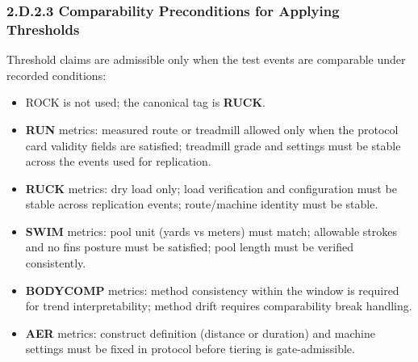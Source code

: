 \documentclass[10pt]{article}
\begin{document}
\subsubsection*{2.D.2.3 Comparability Preconditions for Applying Thresholds}

Threshold claims are admissible only when the test events are comparable under recorded conditions:

\begin{itemize}
\item ROCK is not used; the canonical tag is \textbf{RUCK}.
\item \textbf{RUN} metrics: measured route or treadmill allowed only when the protocol card validity fields are satisfied; treadmill grade and settings must be stable across the events used for replication.
\item \textbf{RUCK} metrics: dry load only; load verification and configuration must be stable across replication events; route/machine identity must be stable.
\item \textbf{SWIM} metrics: pool unit (yards vs meters) must match; allowable strokes and no fins posture must be satisfied; pool length must be verified consistently.
\item \textbf{BODYCOMP} metrics: method consistency within the window is required for trend interpretability; method drift requires comparability break handling.
\item \textbf{AER} metrics: construct definition (distance or duration) and machine settings must be fixed in protocol before tiering is gate-admissible.
\end{itemize}
\end{document}
